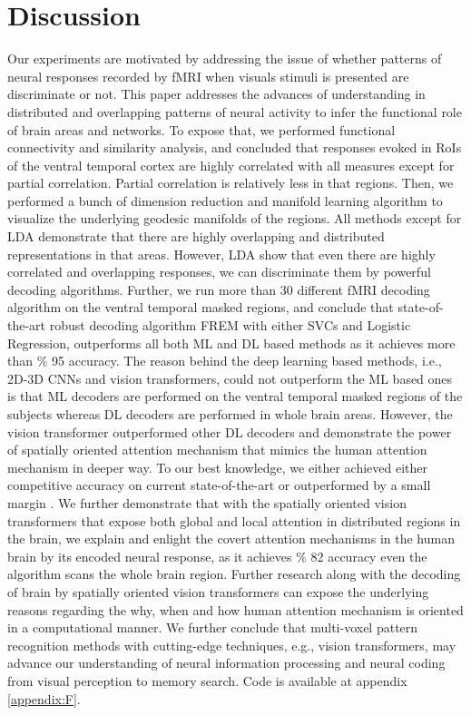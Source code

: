 \documentclass[10pt, twocolumn, letterpaper]{article}
\begin{document}
\section{Discussion}
Our experiments are motivated by addressing the issue of whether patterns of neural responses recorded by fMRI when visuals stimuli is presented are discriminate or not. This paper addresses the advances of understanding in distributed and overlapping patterns of neural activity to infer the functional role of brain areas and networks. To expose that, we performed functional connectivity and similarity analysis, and concluded that responses evoked in RoIs of the ventral temporal cortex are highly correlated with all measures except for partial correlation. Partial correlation is relatively less in that regions. Then, we performed a bunch of dimension reduction and manifold learning algorithm to visualize the underlying geodesic manifolds of the regions. All methods except for LDA demonstrate that there are highly overlapping and distributed representations in that areas. However, LDA show that even there are highly correlated and overlapping responses, we can discriminate them by powerful decoding algorithms. Further, we run more than 30 different fMRI decoding algorithm on the ventral temporal masked regions, and conclude that state-of-the-art robust decoding algorithm FREM with either SVCs and Logistic Regression, outperforms all both ML and DL based methods as it achieves more than \% 95 accuracy. The reason behind the deep learning based methods, i.e., 2D-3D CNNs and vision transformers, could not outperform the ML based ones is that ML decoders are performed on the ventral temporal masked regions of the subjects whereas DL decoders are performed in whole brain areas. However, the vision transformer outperformed other DL decoders and demonstrate the power of spatially oriented attention mechanism that mimics the human attention mechanism in deeper way. To our best knowledge, we either achieved either competitive accuracy on current state-of-the-art or outperformed by a small margin \cite{treder2020mvpa, norman2006beyond}. We further demonstrate that with the spatially oriented vision transformers that expose both global and local attention in distributed regions in the brain, we explain and enlight the covert attention mechanisms in the human brain by its encoded neural response, as it achieves \% 82 accuracy even the algorithm scans the whole brain region. Further research along with the decoding of brain by spatially oriented vision transformers can expose the underlying reasons regarding the why, when and how human attention mechanism is oriented in a computational manner. We further conclude that multi-voxel pattern recognition methods with cutting-edge techniques, e.g., vision transformers, may advance our understanding of neural information processing and neural coding from visual perception to memory search. Code is available at appendix \ref{appendix:F}.     
\end{document}
